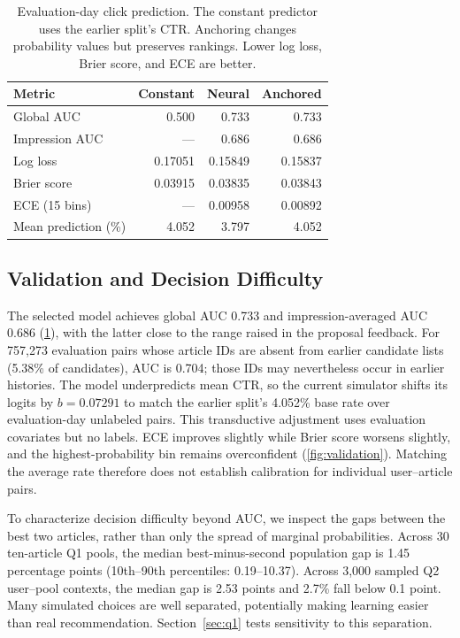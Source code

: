 \documentclass{article}
\begin{document}
\begin{table}[!ht]
\caption{Evaluation-day click prediction. The constant predictor uses the earlier split's CTR. Anchoring changes probability values but preserves rankings. Lower log loss, Brier score, and ECE are better.}
\label{tab:simulator}
\centering
\small
\setlength{\tabcolsep}{3.2pt}
\begin{tabular}{lrrr}
\toprule
Metric & Constant & Neural & Anchored \\
\midrule
Global AUC & 0.500 & 0.733 & 0.733 \\
Impression AUC & --- & 0.686 & 0.686 \\
Log loss & 0.17051 & 0.15849 & 0.15837 \\
Brier score & 0.03915 & 0.03835 & 0.03843 \\
ECE (15 bins) & --- & 0.00958 & 0.00892 \\
Mean prediction (\%) & 4.052 & 3.797 & 4.052 \\
\bottomrule
\end{tabular}
\end{table}

\subsection{Validation and Decision Difficulty}
The selected model achieves global AUC 0.733 and impression-averaged AUC 0.686 (\cref{tab:simulator}), with the latter close to the range raised in the proposal feedback. For 757,273 evaluation pairs whose article IDs are absent from earlier candidate lists (5.38\% of candidates), AUC is 0.704; those IDs may nevertheless occur in earlier histories. The model underpredicts mean CTR, so the current simulator shifts its logits by $b=0.07291$ to match the earlier split's 4.052\% base rate over evaluation-day unlabeled pairs. This transductive adjustment uses evaluation covariates but no labels. ECE improves slightly while Brier score worsens slightly, and the highest-probability bin remains overconfident (\cref{fig:validation}). Matching the average rate therefore does not establish calibration for individual user--article pairs.

To characterize decision difficulty beyond AUC, we inspect the gaps between the best two articles, rather than only the spread of marginal probabilities. Across 30 ten-article Q1 pools, the median best-minus-second population gap is 1.45 percentage points (10th--90th percentiles: 0.19--10.37). Across 3,000 sampled Q2 user--pool contexts, the median gap is 2.53 points and 2.7\% fall below 0.1 point. Many simulated choices are well separated, potentially making learning easier than real recommendation. Section~\ref{sec:q1} tests sensitivity to this separation.
\end{document}
